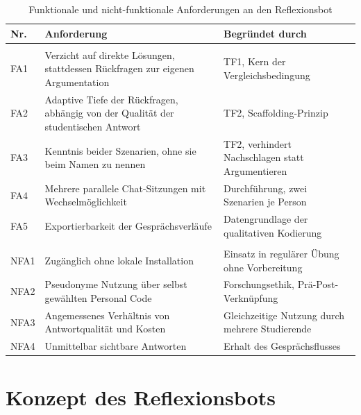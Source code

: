 \begin{table}[!t]
\centering
\caption{Funktionale und nicht-funktionale Anforderungen an den Reflexionsbot}
\label{tab:anforderungen}
\renewcommand{\arraystretch}{1.3}
\setlength{\tabcolsep}{8pt}
\begin{tabular}{>{\raggedright\arraybackslash}p{}
                >{\raggedright\arraybackslash}p{}
                >{\raggedright\arraybackslash}p{}}
\toprule
\textbf{Nr.} & \textbf{Anforderung} & \textbf{Begründet durch} \\
\midrule
\multicolumn{3}{@{}l}{\textit{Funktionale Anforderungen}} \\
\midrule
FA1 & Verzicht auf direkte Lösungen, stattdessen Rückfragen zur eigenen Argumentation &
TF1, Kern der Vergleichs\-bedingung \\
\midrule
FA2 & Adaptive Tiefe der Rückfragen, abhängig von der Qualität der studentischen Antwort &
TF2, Scaffolding-Prinzip \\
\midrule
FA3 & Kenntnis beider Szenarien, ohne sie beim Namen zu nennen &
TF2, verhindert Nachschlagen statt Argumentieren \\
\midrule
FA4 & Mehrere parallele Chat-Sitzungen mit Wechselmöglichkeit &
Durchführung, zwei Szenarien je Person \\
\midrule
FA5 & Exportierbarkeit der Gesprächsverläufe &
Datengrundlage der qualitativen Kodierung \\
\midrule
\multicolumn{3}{@{}l}{\textit{Nicht-funktionale Anforderungen}} \\
\midrule
NFA1 & Zugänglich ohne lokale Installation &
Einsatz in regulärer Übung ohne Vorbereitung \\
\midrule
NFA2 & Pseudonyme Nutzung über selbst gewählten Personal Code &
Forschungsethik, Prä-Post-Verknüpfung \\
\midrule
NFA3 & Angemessenes Verhältnis von Antwortqualität und Kosten &
Gleichzeitige Nutzung durch mehrere Studierende \\
\midrule
NFA4 & Unmittelbar sichtbare Antworten &
Erhalt des Gesprächsflusses \\
\bottomrule
\end{tabular}
\end{table}

\section{Konzept des Reflexionsbots}
\label{sec:konzept-reflexionsbot}

